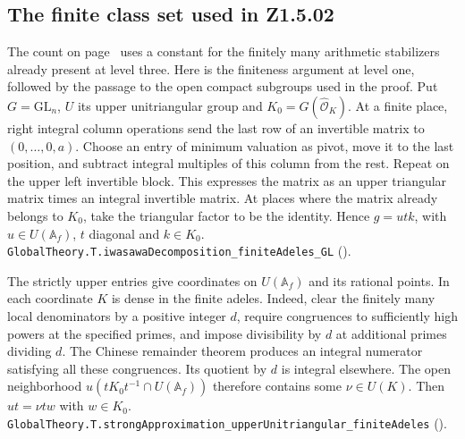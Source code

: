 \subsection{The finite class set used in Z1.5.02}\label{r7:review:Z1.5.02}
The count on page~\pageref{r6:Z1.5.02} uses a constant for the finitely many arithmetic stabilizers already present at level three. Here is the finiteness argument at level one, followed by the passage to the open compact subgroups used in the proof. Put $G=\mathrm{GL}_n$, $U$ its upper unitriangular group and $K_0=G(\widehat{\mathcal O}_K)$. At a finite place, right integral column operations send the last row of an invertible matrix to $(0,\ldots,0,a)$. Choose an entry of minimum valuation as pivot, move it to the last position, and subtract integral multiples of this column from the rest. Repeat on the upper left invertible block. This expresses the matrix as an upper triangular matrix times an integral invertible matrix. At places where the matrix already belongs to $K_0$, take the triangular factor to be the identity. Hence $g=utk$, with $u\in U(\mathbb A_f)$, $t$ diagonal and $k\in K_0$. \nolinkurl{GlobalTheory.T.iwasawaDecomposition_finiteAdeles_GL} ().

The strictly upper entries give coordinates on $U(\mathbb A_f)$ and its rational points. In each coordinate $K$ is dense in the finite adeles. Indeed, clear the finitely many local denominators by a positive integer $d$, require congruences to sufficiently high powers at the specified primes, and impose divisibility by $d$ at additional primes dividing $d$. The Chinese remainder theorem produces an integral numerator satisfying all these congruences. Its quotient by $d$ is integral elsewhere. The open neighborhood $u(tK_0t^{-1}\cap U(\mathbb A_f))$ therefore contains some $\nu\in U(K)$. Then $ut=\nu tw$ with $w\in K_0$. \nolinkurl{GlobalTheory.T.strongApproximation_upperUnitriangular_finiteAdeles} ().

